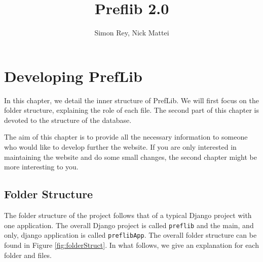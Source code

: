 \documentclass{report}
\begin{document}
	\title{Preflib 2.0}
	\author{Simon Rey, Nick Mattei}
	\maketitle
	
	\tableofcontents
	
	\chapter{Developing PrefLib}
	
	In this chapter, we detail the inner structure of PrefLib. We will first focus on the folder structure, explaining the role of each file. The second part of this chapter is devoted to the structure of the database. 
	
	The aim of this chapter is to provide all the necessary information to someone who would like to develop further the website. If you are only interested in maintaining the website and do some small changes, the second chapter might be more interesting to you.
	
	\section{Folder Structure}
	
	The folder structure of the project follows that of a typical Django project with one application. The overall Django project is called \texttt{preflib} and the main, and only, django application is called \texttt{preflibApp}. The overall folder structure can be found in Figure \ref{fig:folderStruct}. In what follows, we give an explanation for each folder and files.
	
\end{document}
